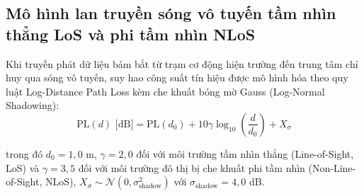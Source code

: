 \begin{table}[H]
\centering
\caption{Đặc tính kỹ thuật và chi phí tính toán của các khối đồng bộ đa tốc độ}
\label{tab:multirate-synchronization-performance}
\end{table}

\subsection{Mô hình lan truyền sóng vô tuyến tầm nhìn thẳng LoS và phi tầm nhìn NLoS}

\hspace{0.5cm} Khi truyền phát dữ liệu bám bắt từ trạm cơ động hiện trường đến trung tâm chỉ huy qua sóng vô tuyến, suy hao công suất tín hiệu được mô hình hóa theo quy luật Log-Distance Path Loss kèm che khuất bóng mờ Gauss (Log-Normal Shadowing):
\begin{equation}
\text{PL}(d)\text{ [dB]} = \text{PL}(d_0) + 10 \gamma \log_{10}\left(\frac{d}{d_0}\right) + X_\sigma
\label{eq:log-distance-path-loss}
\end{equation}

trong đó $d_0 = 1{,}0$ m, $\gamma = 2{,}0$ đối với môi trường tầm nhìn thẳng (Line-of-Sight, LoS) và $\gamma = 3{,}5$ đối với môi trường đô thị bị che khuất phi tầm nhìn (Non-Line-of-Sight, NLoS), $X_\sigma \sim \mathcal{N}(0, \sigma_{\text{shadow}}^2)$ với $\sigma_{\text{shadow}} = 4{,}0$ dB.

